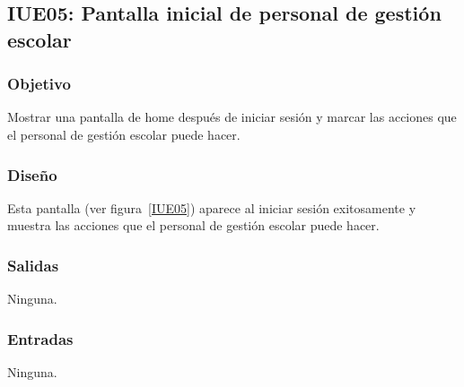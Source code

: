 \subsection{IUE05: Pantalla inicial de personal de gestión escolar}

\subsubsection{Objetivo}
Mostrar una pantalla de home después de iniciar sesión y marcar las acciones que el personal de gestión escolar puede hacer.

\subsubsection{Diseño}
Esta pantalla  (ver figura~\ref{IUE05}) aparece al iniciar sesión exitosamente y muestra las acciones que el personal de gestión escolar puede hacer. 


\subsubsection{Salidas}

Ninguna.

\subsubsection{Entradas}
Ninguna.

